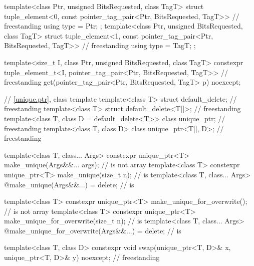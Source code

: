 \begin{codeblock}
{  template<class Ptr, unsigned BitsRequested, class TagT>
    struct tuple_element<0, const pointer_tag_pair<Ptr, BitsRequested, TagT>> {     // freestanding
      using type = Ptr;
    };
  template<class Ptr, unsigned BitsRequested, class TagT>
    struct tuple_element<1, const pointer_tag_pair<Ptr, BitsRequested, TagT>> {     // freestanding
      using type = TagT;
    };

  template<size_t I, class Ptr, unsigned BitsRequested, class TagT>
    constexpr tuple_element_t<I, pointer_tag_pair<Ptr, BitsRequested, TagT>>        // freestanding
      get(pointer_tag_pair<Ptr, BitsRequested, TagT> p) noexcept;

  // \ref{unique.ptr}, class template 
  template<class T> struct default_delete;                                          // freestanding
  template<class T> struct default_delete<T[]>;                                     // freestanding
  template<class T, class D = default_delete<T>> class unique_ptr;                  // freestanding
  template<class T, class D> class unique_ptr<T[], D>;                              // freestanding

  template<class T, class... Args>
    constexpr unique_ptr<T> make_unique(Args&&... args);                        //  is not array
  template<class T>
    constexpr unique_ptr<T> make_unique(size_t n);                              //  is 
  template<class T, class... Args>
    @\unspecnc@ make_unique(Args&&...) = delete;                                //  is 

  template<class T>
    constexpr unique_ptr<T> make_unique_for_overwrite();                        //  is not array
  template<class T>
    constexpr unique_ptr<T> make_unique_for_overwrite(size_t n);                //  is 
  template<class T, class... Args>
    @\unspecnc@ make_unique_for_overwrite(Args&&...) = delete;                  //  is 

  template<class T, class D>
    constexpr void swap(unique_ptr<T, D>& x, unique_ptr<T, D>& y) noexcept;         // freestanding

}
\end{codeblock}

